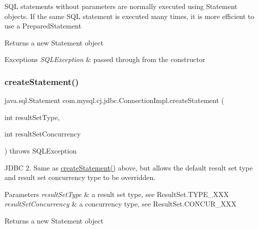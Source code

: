 S\+QL statements without parameters are normally executed using Statement objects. If the same S\+QL statement is executed many times, it is more efficient to use a Prepared\+Statement

\begin{DoxyReturn}{Returns}
a new Statement object 
\end{DoxyReturn}

\begin{DoxyExceptions}{Exceptions}
{\em S\+Q\+L\+Exception} & passed through from the constructor \\
\hline
\end{DoxyExceptions}
\mbox{\label{classcom_1_1mysql_1_1cj_1_1jdbc_1_1_connection_impl_a0d60b523a6d4c9b50523770c41b9ed3a}} 
\subsubsection{\texorpdfstring{create\+Statement()}{createStatement()}\hspace{0.1cm}{\footnotesize\ttfamily [2/3]}}
{\footnotesize\ttfamily java.\+sql.\+Statement com.\+mysql.\+cj.\+jdbc.\+Connection\+Impl.\+create\+Statement (\begin{DoxyParamCaption}\item[{int}]{result\+Set\+Type,  }\item[{int}]{result\+Set\+Concurrency }\end{DoxyParamCaption}) throws S\+Q\+L\+Exception}

J\+D\+BC 2. Same as \mbox{\hyperlink{classcom_1_1mysql_1_1cj_1_1jdbc_1_1_connection_impl_ac07000b85a6e8197ac8ca945bc44bbec}{create\+Statement()}} above, but allows the default result set type and result set concurrency type to be overridden.


\begin{DoxyParams}{Parameters}
{\em result\+Set\+Type} & a result set type, see Result\+Set.\+T\+Y\+P\+E\+\_\+\+X\+XX \\
\hline
{\em result\+Set\+Concurrency} & a concurrency type, see Result\+Set.\+C\+O\+N\+C\+U\+R\+\_\+\+X\+XX \\
\hline
\end{DoxyParams}
\begin{DoxyReturn}{Returns}
a new Statement object 
\end{DoxyReturn}

